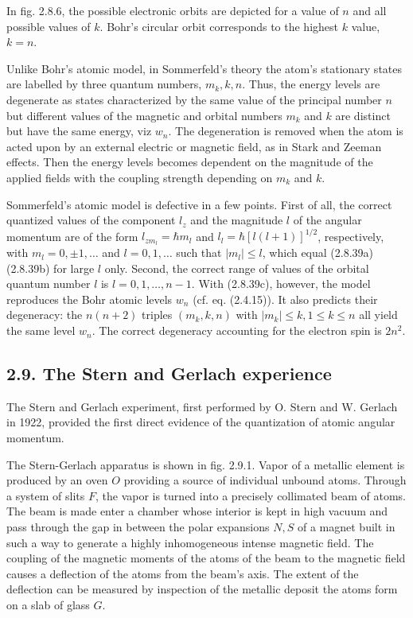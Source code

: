 \documentclass{article}
\begin{document}
In fig. 2.8.6, the possible electronic orbits are depicted for a value of $n$ and all possible values of $k$. Bohr's circular orbit corresponds to the highest $k$ value, $k=n$.

Unlike Bohr's atomic model, in Sommerfeld's theory the atom's stationary states are labelled by three quantum numbers, $m_{k}, k, n$. Thus, the energy levels are degenerate as states characterized by the same value of the principal number $n$ but different values of the magnetic and orbital numbers $m_{k}$ and $k$ are distinct but have the same energy, viz $w_{n}$. The degeneration is removed when the atom
is acted upon by an external electric or magnetic field, as in Stark and Zeeman effects. Then the energy levels becomes dependent on the magnitude of the applied fields with the coupling strength depending on $m_{k}$ and $k$.

Sommerfeld's atomic model is defective in a few points. First of all, the correct quantized values of the component $l_{z}$ and the magnitude $l$ of the angular momentum are of the form $l_{z m_{l}}=\hbar m_{l}$ and $l_{l}=\hbar[l(l+1)]^{1 / 2}$, respectively, with $m_{l}=0, \pm 1, \ldots$ and $l=0,1, \ldots$ such that $\left|m_{l}\right| \leq l$, which equal (2.8.39a) (2.8.39b) for large $l$ only. Second, the correct range of values of the orbital quantum number $l$ is $l=0,1, \ldots, n-1$. With (2.8.39c), however, the model reproduces the Bohr atomic levels $w_{n}$ (cf. eq. (2.4.15)). It also predicts their degeneracy: the $n(n+2)$ triples $\left(m_{k}, k, n\right)$ with $\left|m_{k}\right| \leq k, 1 \leq k \leq n$ all yield the same level $w_{n}$. The correct degeneracy accounting for the electron spin is $2 n^{2}$.

\subsection*{2.9. The Stern and Gerlach experience}

The Stern and Gerlach experiment, first performed by O. Stern and W. Gerlach in 1922, provided the first direct evidence of the quantization of atomic angular momentum.

The Stern-Gerlach apparatus is shown in fig. 2.9.1. Vapor of a metallic element is produced by an oven $O$ providing a source of individual unbound atoms. Through a system of slits $F$, the vapor is turned into a precisely collimated beam of atoms. The beam is made enter a chamber whose interior is kept in high vacuum and pass through the gap in between the polar expansions $N, S$ of a magnet built in such a way to generate a highly inhomogeneous intense magnetic field. The coupling of the magnetic moments of the atoms of the beam to the magnetic field causes a deflection of the atoms from the beam's axis. The extent of the deflection can be measured by inspection of the metallic deposit the atoms form on a slab of glass $G$.
\end{document}
